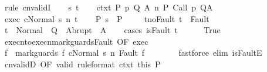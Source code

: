 \begin{isabellebody}
%
\isadelimproof
%
\endisadelimproof
%
\isatagproof
{}\isamarkupfalse%
\ {\isacharparenleft}rule\ cnvalidI{\isacharparenright}\isanewline
\ \ \isamarkupfalse%
\ s\ t\isanewline
\ \ \isamarkupfalse%
\ ctxt{\isacharcolon}\ {\isachardoublequoteopen}{\isasymforall}{\isacharparenleft}P{\isacharcomma}\ p{\isacharcomma}\ Q{\isacharcomma}\ A{\isacharparenright}{\isasymin}{\isasymTheta}{\isachardot}\ {\isasymGamma}{\isasymTurnstile}n{\isacharcolon}\isactrlbsub {\isacharslash}{\isacharbraceleft}{\isacharbraceright}\isactrlesub \ P\ {\isacharparenleft}Call\ p{\isacharparenright}\ Q{\isacharcomma}A{\isachardoublequoteclose}\ \isanewline
\ \ \isamarkupfalse%
\ exec{\isacharcolon}\ {\isachardoublequoteopen}{\isasymGamma}{\isasymturnstile}{\isasymlangle}c{\isacharcomma}Normal\ s{\isasymrangle}\ {\isacharequal}n{\isasymRightarrow}\ t{\isachardoublequoteclose}\isanewline
\ \ \isamarkupfalse%
\ P{\isacharcolon}\ {\isachardoublequoteopen}s\ {\isasymin}\ P{\isachardoublequoteclose}\ \isanewline
\ \ \isamarkupfalse%
\ t{\isacharunderscore}noFault{\isacharcolon}\ {\isachardoublequoteopen}t\ {\isasymnotin}\ Fault\ {\isacharbackquote}\ {\isacharbraceleft}{\isacharbraceright}{\isachardoublequoteclose}\isanewline
\ \ \isamarkupfalse%
\ {\isachardoublequoteopen}t\ {\isasymin}\ Normal\ {\isacharbackquote}\ Q\ {\isasymunion}\ Abrupt\ {\isacharbackquote}\ A{\isachardoublequoteclose}\isanewline
\ \ \isamarkupfalse%
\ {\isacharparenleft}cases\ {\isachardoublequoteopen}isFault\ t{\isachardoublequoteclose}{\isacharparenright}\isanewline
\ \ \ \ \isamarkupfalse%
\ True\isanewline
\ \ \ \ \isamarkupfalse%
\ execn{\isacharunderscore}to{\isacharunderscore}execn{\isacharunderscore}mark{\isacharunderscore}guards{\isacharunderscore}Fault\ {\isacharbrackleft}OF\ exec\ {\isacharbrackright}\isanewline
\ \ \ \ \isamarkupfalse%
\ f{\isacharprime}\ \ {\isachardoublequoteopen}{\isasymGamma}{\isasymturnstile}{\isasymlangle}mark{\isacharunderscore}guards\ f\ c{\isacharcomma}Normal\ s{\isasymrangle}\ {\isacharequal}n{\isasymRightarrow}\ Fault\ f{\isacharprime}{\isachardoublequoteclose}\isanewline
\ \ \ \ \ \ \isamarkupfalse%
\ {\isacharparenleft}fastforce\ elim{\isacharcolon}\ isFaultE{\isacharparenright}\isanewline
\ \ \ \ \isamarkupfalse%
\ cnvalidD\ {\isacharbrackleft}OF\ valid\ {\isacharbrackleft}rule{\isacharunderscore}format{\isacharbrackright}\ ctxt\ this\ P{\isacharbrackright}\isanewline

\end{isabellebody}
